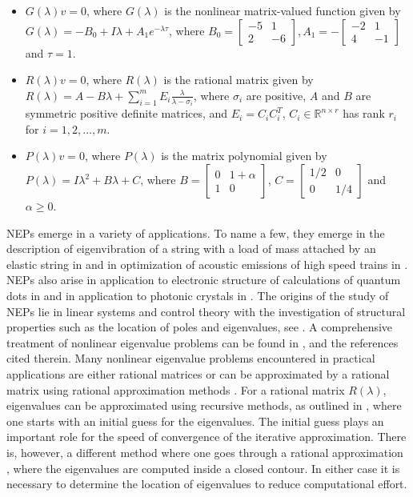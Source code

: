 \documentclass[12pt, reqno]{amsart}
\theoremstyle{definition}
\theoremstyle{remark}
\numberwithin{equation}{section}
\begin{document}
\begin{itemize}
\item[(i)] $G(\lambda)v= 0$, where $G(\lambda)$ is the nonlinear matrix-valued 
function given by $ G(\lambda) = -B_0 + I \lambda + A_1 e ^ {-\lambda \tau}$, 
where $B_0 = \begin{bmatrix}
-5 & 1 \\
2 & -6
\end{bmatrix}, A_1 = -\begin{bmatrix}
-2 & 1 \\
4 & -1
\end{bmatrix}$ and $\tau = 1$.
\item[(ii)] $R(\lambda)v=0$, where $R(\lambda)$ is the rational matrix given by 
$R(\lambda) = A-B\lambda + \displaystyle \sum_{i = 1}^{m} E_i \frac{\lambda}{\lambda-\sigma_i}$, 
where $\sigma_i$ are positive, $A $ and $B$ are symmetric positive definite 
matrices, and $E_i= C_iC_i^T$, $C_i \in \mathbb{R}^{n\times r}$ has rank $r_i$ 
for $ i=1,2,\ldots,m$.
\item[(iii)] $P(\lambda)v=0$, where $P(\lambda)$ is the matrix polynomial given 
by $P(\lambda) = I \lambda^2 +B \lambda +C$, where $B = \begin{bmatrix}
0 & 1+\alpha \\
1 & 0
\end{bmatrix}$, $C = \begin{bmatrix}
1/2 & 0\\
0 & 1/4
\end{bmatrix}$ and $\alpha \geq 0$.
\end{itemize} 
NEPs emerge in a variety of applications. To name a few, they emerge in the description of eigenvibration of a string with a load of mass attached by an elastic string 
in \cite{Betcke-Higham-Tisseur} and in optimization of acoustic emissions of high 
speed trains in \cite{Mackey}. NEPs also arise in application to electronic structure of calculations of quantum 
dots in \cite{Heinrich} and in application to photonic crystals in 
\cite{Engstrom-Langer-Tretter}. The origins of the study of NEPs lie in linear systems and control theory with the investigation of structural properties such as the location of poles and eigenvalues, see \cite{Kailath}. 
A comprehensive treatment of nonlinear eigenvalue problems can be found in 
\cite{Dopico}, \cite{Mehrmann-Voss} 
and the references cited therein. Many nonlinear eigenvalue problems encountered 
in practical applications are either rational matrices or can be approximated by 
a rational matrix using rational approximation methods \cite{Saad-Guide-Meidlar}. 
For a rational matrix $R(\lambda)$, eigenvalues can be approximated using recursive methods, as outlined in \cite{Mehrmann-Voss}, where one starts 
with an initial guess for the eigenvalues. The initial guess plays an important role for the speed of convergence of the iterative approximation. There is, however, a 
different method where one goes through a rational approximation 
\cite{Saad-Guide-Meidlar} , where the eigenvalues are computed inside a closed 
contour. In either case it is necessary to determine the location of eigenvalues to reduce computational effort.
\end{document}
